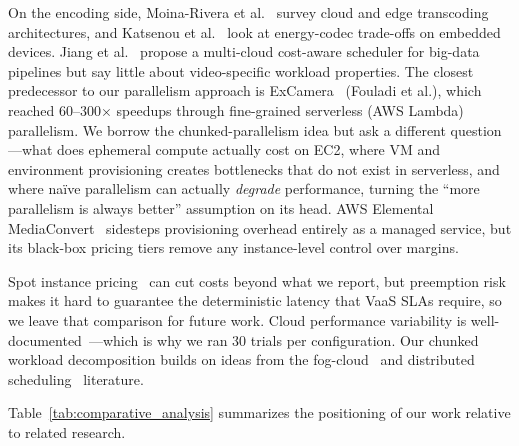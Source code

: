 \documentclass[conference]{IEEEtran}
\begin{document}
On the encoding side, Moina-Rivera et al.~\cite{b22} survey cloud and edge transcoding architectures, and Katsenou et al.~\cite{b8} look at energy-codec trade-offs on embedded devices. Jiang et al.~\cite{b20} propose a multi-cloud cost-aware scheduler for big-data pipelines but say little about video-specific workload properties. The closest predecessor to our parallelism approach is ExCamera~\cite{excamera} (Fouladi et al.), which reached 60--300$\times$ speedups through fine-grained serverless (AWS Lambda) parallelism. We borrow the chunked-parallelism idea but ask a different question---what does ephemeral compute actually cost on EC2, where VM and environment provisioning creates bottlenecks that do not exist in serverless, and where na\"{i}ve parallelism can actually \emph{degrade} performance, turning the ``more parallelism is always better'' assumption on its head. AWS Elemental MediaConvert~\cite{awsmediaconvert} sidesteps provisioning overhead entirely as a managed service, but its black-box pricing tiers remove any instance-level control over margins.

Spot instance pricing~\cite{b21,b19} can cut costs beyond what we report, but preemption risk makes it hard to guarantee the deterministic latency that VaaS SLAs require, so we leave that comparison for future work. Cloud performance variability is well-documented~\cite{b18,b10}---which is why we ran 30 trials per configuration. Our chunked workload decomposition builds on ideas from the fog-cloud~\cite{b12} and distributed scheduling~\cite{b13} literature.

Table~\ref{tab:comparative_analysis} summarizes the positioning of our work relative to related research.
\end{document}

